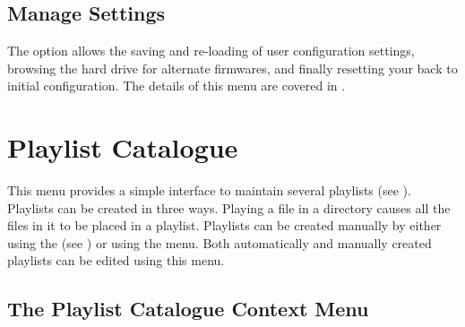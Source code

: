 
\subsection{Manage Settings}
The  option allows the saving and re-loading of user 
configuration settings, browsing the hard drive for alternate firmwares, and finally
resetting your \dap{} back to initial configuration.
%
The details of this menu are covered in
.



\section{\label{ref:playlistoptions}Playlist Catalogue}
  This menu provides a simple interface to maintain
  several playlists (see ). Playlists can be created in
  three ways. Playing a file in a directory causes all the files in it
  to be placed in a playlist. Playlists can be created manually by
  either using the   (see ) or using
  the  menu. Both automatically and manually created
  playlists can be edited using this menu.

\subsection{\label{ref:playlistcatalogue_contextmenu}The Playlist Catalogue Context Menu}

